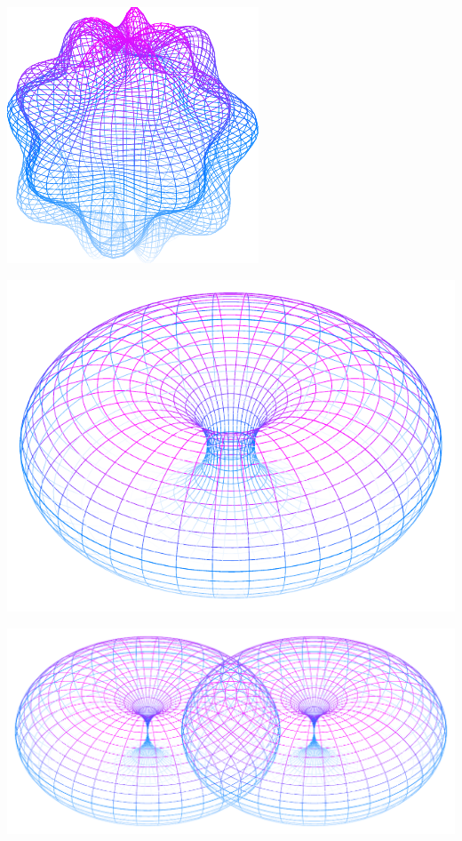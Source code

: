 \documentclass[11pt,openany]{article}
\begin{document}
\vfill
\begin{center}
\begin{minipage}{.32\textwidth}\centering
	\includegraphics[scale=.8]{../tikz/grad-math-tikz-pdf/sphere2.pdf}
\end{minipage}\hfill
\begin{minipage}{.32\textwidth}\centering
	\includegraphics[scale=.45]{../tikz/grad-math-tikz-pdf/torus4.pdf}
\end{minipage}\hfill
\begin{minipage}{.32\textwidth}\centering
	\includegraphics[scale=.325]{../tikz/grad-math-tikz-pdf/double-torus5.pdf}
\end{minipage}
\end{center}
\end{document}
